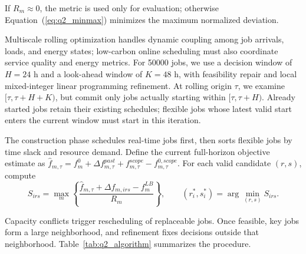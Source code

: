 If $R_m\approx0$, the metric is used only for evaluation; otherwise Equation~(\ref{eq:q2_minmax}) minimizes the maximum normalized deviation.

Multiscale rolling optimization handles dynamic coupling among job arrivals, loads, and energy states\cite{ref7}; low-carbon online scheduling must also coordinate service quality and energy metrics\cite{ref8}. For 50000 jobs, we use a decision window of $H=24$ h and a look-ahead window of $K=48$ h, with feasibility repair and local mixed-integer linear programming refinement.
At rolling origin $\tau$,
we examine $[\tau,\tau+H+K)$,
but commit only jobs actually starting within $[\tau,\tau+H)$.
Already started jobs retain their existing schedules;
flexible jobs whose latest valid start enters the current window must start in this iteration.

The construction phase schedules real-time jobs first, then sorts flexible jobs by time slack and resource demand.
Define the current full-horizon objective estimate as
$\hat f_{m,\tau}
=f_m^0+\Delta f_{m,\tau}^{past}
+f_{m,\tau}^{scope}-f_{m,\tau}^{0,scope}$.
For each valid candidate $(r,s)$, compute
\begin{equation}
	S_{irs}
	=
	\max_m
	\left\{
	\frac{
		\hat f_{m,\tau}
		+\Delta f_{m,irs}
		-f_m^{LB}}
	{R_m}
	\right\},
	\qquad
	(r_i^*,s_i^*)
	=
	\arg\min_{(r,s)}S_{irs}.
	\label{eq:q2_marginal}
\end{equation}

Capacity conflicts trigger rescheduling of replaceable jobs. Once feasible, key jobs form a large neighborhood, and refinement fixes decisions outside that neighborhood. Table~\ref{tab:q2_algorithm} summarizes the procedure.

